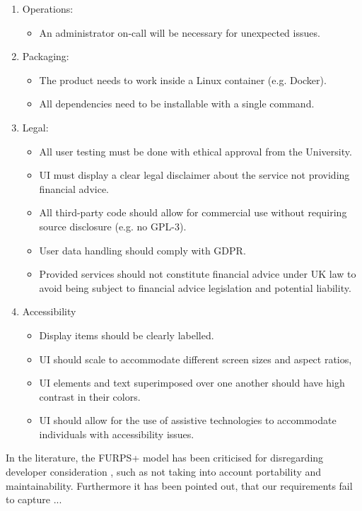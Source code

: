 \documentclass[main.tex]{subfiles}
\begin{document}
\begin{enumerate}
\begin{itemize}
   \end{itemize}
       \item Operations:
      \begin{itemize}
     \item An administrator on-call will be necessary for unexpected issues.
   \end{itemize}
          \item Packaging:
      \begin{itemize}
     \item The product needs to work inside a Linux container (e.g. Docker).
     \item All dependencies need to be installable with a single command.
   \end{itemize}
             \item Legal:
      \begin{itemize}
     \item All user testing must be done with ethical approval from the University.
     \item UI must display a clear legal disclaimer about the service not providing financial advice.
     \item All third-party code should allow for commercial use without requiring source disclosure (e.g. no GPL-3).
     \item User data handling should comply with GDPR.
     \item Provided services should not constitute financial advice under UK law to avoid being subject to financial advice legislation and potential liability.
   \end{itemize}
             \item Accessibility
      \begin{itemize}
     \item Display items should be clearly labelled.
     \item UI should scale to accommodate different screen sizes and aspect ratios,
     \item UI elements and text superimposed over one another should have high contrast in their colors.
     \item UI should allow for the use of assistive technologies to accommodate individuals with accessibility issues.
   \end{itemize}
\end{enumerate}

In the literature, the FURPS+ model has been criticised for disregarding developer consideration  \cite{FURPS_drawbacks}, such as not taking into account portability and maintainability. 
Furthermore it has been pointed out, that our requirements fail to capture ...
\end{document}
